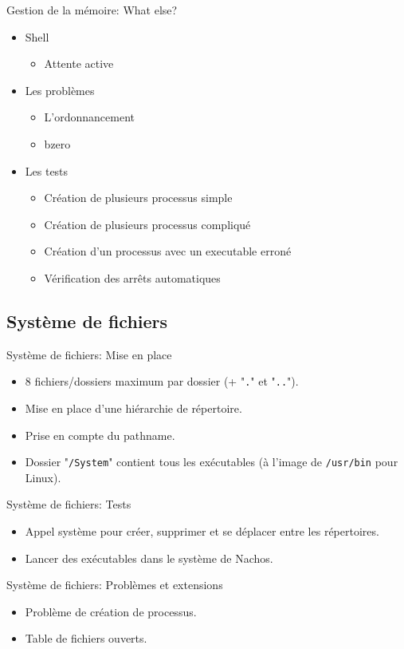 \documentclass{beamer}
\begin{document}
\begin{frame}{Gestion de la mémoire: What else?}
    \begin{itemize}
        \item Shell
        \begin{itemize}
 			\item Attente active
 		\end{itemize}
        \item Les problèmes
        \begin{itemize}
 		\item L'ordonnancement
 		\item bzero
  		\end{itemize}
        \item Les tests
        \begin{itemize}
 		\item Création de plusieurs processus simple
 		\item Création de plusieurs processus compliqué
 		\item Création d'un processus avec un executable erroné
 		\item Vérification des arrêts automatiques
  		\end{itemize}
    \end{itemize}
\end{frame}

\subsection{Système de fichiers}

\begin{frame}{Système de fichiers: Mise en place }
    \begin{itemize}
		\item 8 fichiers/dossiers maximum par dossier (+ "\texttt{.}" et "\texttt{..}").
		\item Mise en place d'une hiérarchie de répertoire.
		\item Prise en compte du pathname.
		\item Dossier "\texttt{/System}" contient tous les exécutables (à l'image de \texttt{/usr/bin} pour Linux).
    \end{itemize}
\end{frame}
\begin{frame}{Système de fichiers: Tests }
    \begin{itemize}
		\item Appel système pour créer, supprimer et se déplacer entre les répertoires.
		\item Lancer des exécutables dans le système de Nachos.
		
    \end{itemize}
\end{frame}
\begin{frame}{Système de fichiers: Problèmes et extensions }
    \begin{itemize}
		\item Problème de création de processus. 
		\item Table de fichiers ouverts.
		
    \end{itemize}
\end{frame}
\end{document}
